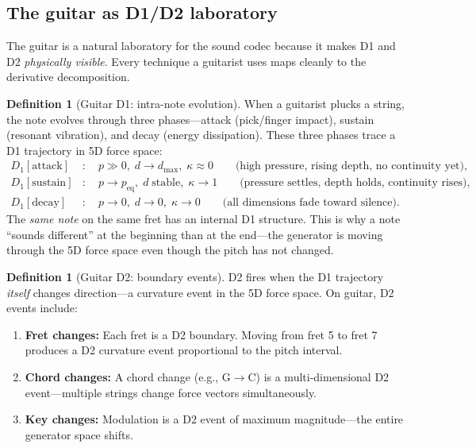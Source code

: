 \documentclass[11pt]{article}
\theoremstyle{definition}
\newtheorem{definition}[theorem]{Definition}
\theoremstyle{remark}
\begin{document}
\subsection{The guitar as D1/D2 laboratory}

The guitar is a natural laboratory for the sound codec because it makes D1 and D2
\emph{physically visible}.  Every technique a guitarist uses maps cleanly to the
derivative decomposition.

\begin{definition}[Guitar D1: intra-note evolution]
When a guitarist plucks a string, the note evolves through three phases---attack
(pick/finger impact), sustain (resonant vibration), and decay (energy dissipation).
These three phases trace a D1 trajectory in 5D force space:
\begin{align}
  D_1[\text{attack}] &: \quad p \gg 0, \; d \to d_{\max}, \; \kappa \approx 0
    \qquad\text{(high pressure, rising depth, no continuity yet)}, \\
  D_1[\text{sustain}] &: \quad p \to p_{\text{eq}}, \; d \;\text{stable}, \; \kappa \to 1
    \qquad\text{(pressure settles, depth holds, continuity rises)}, \\
  D_1[\text{decay}] &: \quad p \to 0, \; d \to 0, \; \kappa \to 0
    \qquad\text{(all dimensions fade toward silence)}.
\end{align}
The \emph{same note} on the same fret has an internal D1 structure.  This is why
a note ``sounds different'' at the beginning than at the end---the generator is
moving through the 5D force space even though the pitch has not changed.
\end{definition}

\begin{definition}[Guitar D2: boundary events]
D2 fires when the D1 trajectory \emph{itself} changes direction---a curvature event
in the 5D force space.  On guitar, D2 events include:
\begin{enumerate}[nosep]
  \item \textbf{Fret changes:} Each fret is a D2 boundary.  Moving from fret 5 to
    fret 7 produces a D2 curvature event proportional to the pitch interval.
  \item \textbf{Chord changes:} A chord change (e.g., G$\to$C) is a multi-dimensional
    D2 event---multiple strings change force vectors simultaneously.
  \item \textbf{Key changes:} Modulation is a D2 event of maximum magnitude---the
    entire generator space shifts.
\end{enumerate}
\end{definition}
\end{document}
